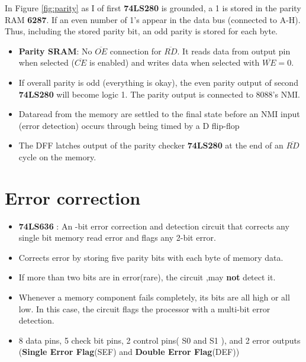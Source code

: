 In Figure \ref{fig:parity} as I of first \textbf{74LS280} is grounded, a 1 is stored in the parity RAM \textbf{6287}. If an even number of 1's appear in the data bus (connected to A-H). Thus, including the stored parity bit, an odd parity is stored for each byte.
\newline
\begin{itemize}
  \item \textbf{Parity SRAM}: No $\overline{OE}$ connection for $\overline{RD}$. It reads data from output pin when selected ($\overline{CE}$ is enabled) and writes data when selected with $\overline{WE} = 0$.
  \item If overall parity is odd (everything is okay), the even parity output of second \textbf{74LS280} will become logic 1. The parity output is connected to 8088's NMI.
  \item Dataread from the memory are settled to the final state before an NMI input (error detection) occurs through being timed by a D flip-flop
  \item The DFF latches output of the parity checker \textbf{74LS280} at the end of an $\overline{RD}$ cycle on the memory.
\end{itemize}

\section{Error correction}
\begin{itemize}
  \item \textbf{74LS636} : An -bit error correction and detection circuit that corrects any single bit memory read error and flags any 2-bit error.
  \item Corrects error by storing five parity bits with each byte of memory data.
  \item If more than two bits are in error(rare), the circuit ,may \textbf{not} detect it.
  \item Whenever a memory component fails completely, its bits are all high or all low. In this case, the circuit flags the processor with a multi-bit error detection.
  \item 8 data pins, 5 check bit pins, 2 control pins( S0 and S1 ), and 2 error outputs (\textbf{Single Error Flag}(SEF) and \textbf{Double Error Flag}(DEF))
\end{itemize}

